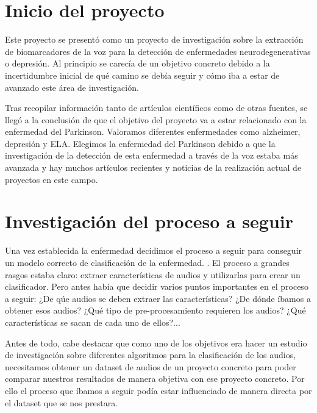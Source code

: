 
\section{Inicio del proyecto}
Este proyecto se presentó como un proyecto de investigación sobre la extracción de biomarcadores de la voz para la detección de enfermedades neurodegenerativas o depresión. Al principio se carecía de un objetivo concreto debido a la incertidumbre inicial de qué camino se debía seguir y cómo iba a estar de avanzado este área de investigación.

Tras recopilar información tanto de artículos científicos como de otras fuentes, se llegó a la conclusión de que el objetivo del proyecto va a estar relacionado con la enfermedad del Parkinson. Valoramos diferentes enfermedades como alzheimer, depresión y ELA. Elegimos la enfermedad del Parkinson debido a que la investigación de la detección de esta enfermedad a través de la voz estaba más avanzada y hay muchos artículos recientes y noticias de la realización actual de proyectos en este campo. 

\section{Investigación del proceso a seguir}
Una vez establecida la enfermedad decidimos el proceso a seguir para conseguir un modelo correcto de clasificación de la enfermedad. . El proceso a grandes rasgos estaba claro: extraer características de audios y utilizarlas para crear un clasificador. Pero antes había que decidir varios puntos importantes en el proceso a seguir: ¿De qúe audios se deben extraer las características? ¿De dónde íbamos a obtener esos audios? ¿Qué tipo de pre-procesamiento requieren los audios? ¿Qué características se sacan de cada uno de ellos?...

Antes de todo, cabe destacar que como uno de los objetivos era hacer un estudio de investigación sobre diferentes algoritmos para la clasificación de los audios, necesitamos obtener un dataset de audios de un proyecto concreto para poder comparar nuestros resultados de manera objetiva con ese proyecto concreto. Por ello el proceso que íbamos a seguir podía estar influenciado de manera directa por el dataset que se nos prestara.

